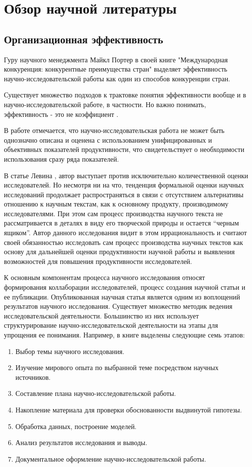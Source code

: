 \chapter{Обзор научной литературы}
\label{cha:review}
\section{Организационная эффективность}
Гуру научного менеджмента Майкл Портер в своей книге "Международная конкуренция: конкурентные преимущества стран" \cite{porter1993m} выделяет эффективность научно-исследовательской работы как один из способов конкуренции стран. 

Существует множество подходов к трактовке понятия эффективности вообще и в научно-исследовательской работе, в частности. Но важно понимать, эффективность - это не коэффициент \cite{tikin2009e}. 

В работе \cite{kle2014o} отмечается, что научно-исследовательская работа не может быть однозначно описана и оценена с использованием унифицированных и объективных показателей продуктивности, что свидетельствует о необходимости использования сразу ряда показателей. 

В статье Левина \cite{levin2016v}, автор выступает против исключительно количественной оценки исследователей. Но несмотря ни на что, тенденция формальной оценки научных исследований продолжает распространяться в связи с отсутствием альтернативы отношению к научным текстам, как к основному продукту, производимому исследователями. При этом сам процесс производства научного текста не рассматривается в деталях в виду его творческой природы и остается ``черным ящиком''. Автор данного исследования видит в этом иррациональность и считают своей обязанностью исследовать сам процесс производства научных текстов как основу для дальнейшей оценки продуктивности научной работы и выявления возможностей для повышения продуктивности исследователей.

К основным компонентам процесса научного исследования относят формирования коллаборации исследователей, процесс создания научной статьи и ее публикации. Опубликованная научная статья является одним из воплощений результатов научного исследования. Существует множество методик ведения исследовательской деятельности. Большинство из них использует структурирование научно-исследовательской деятельности на этапы для упрощения ее понимания. Например, в книге \cite{lipch2013met} выделены следующие семь этапов:
\begin{enumerate}
\tightlist
\item Выбор темы научного исследования.
\item Изучение мирового опыта по выбранной теме посредством научных источников.
\item Составление плана научно-исследовательской работы.
\item Накопление материала для проверки обоснованности выдвинутой гипотезы.
\item Обработка данных, построение моделей.
\item Анализ результатов исследования и выводы.
\item Документальное оформление научно-исследовательской работы.
\end{enumerate}

